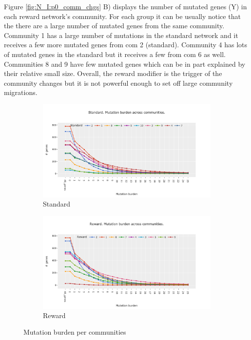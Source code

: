 Figure \ref{fig:N_I:p0_comm_chgs} B) displays the number of mutated genes (Y) in each reward network's community. For each group it can be usually notice that the there are a large number of mutated genes from the same community. Community 1 has a large number of mutations in the standard network and it receives a few more mutated genes from com 2 (standard). Community 4 has lots of mutated genes in the standard but it receives a few from com 6 as well. Communities 8 and 9 have few mutated genes which can be in part explained by their relative small size. Overall, the reward modifier is the trigger of the community changes but it is not powerful enough to set off large community migrations.


\begin{figure}[!htb]
    \hfill
    \begin{subfigure}[b]{0.49\textwidth}
        \centering
        \includegraphics[width=\textwidth,keepaspectratio]{Sections/Network_I/Resources/P0/Comms/Mut_evo_Std_4k_v3.png}
        \caption{Standard}
    \end{subfigure}
    \begin{subfigure}[b]{0.49\textwidth}
        \centering
        \includegraphics[width=\textwidth,keepaspectratio]{Sections/Network_I/Resources/P0/Comms/Mut_evo_Rwd_4k_v3.png}
        \caption{Reward}
    \end{subfigure}
    \caption{Mutation burden per communities}
    \label{fig:N_I:p0_mut_burden}
\end{figure}


